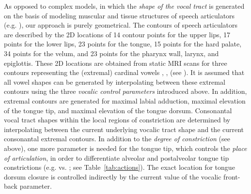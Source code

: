 \documentclass[conference]{IEEEtran}
\let\ipa\textipa
\begin{document}
As opposed to complex models,
in which the \textit{shape of the vocal tract} is
generated on the basis of modeling muscular and tissue structures of
speech articulators (e.g. \cite{dang2004}), our approach is purely
geometrical. The contours of speech articulators are described by the
2D locations of 14 contour points for the upper lips, 17 points for
the lower lips, 23 points for the tongue,
15 points for the hard palate, 34 points for the velum,
and 23 points for the pharynx wall, larynx, and epiglottis.
These 2D locations are obtained from static MRI scans
for three contours representing the (extremal) cardinal vowels \ipa{[i]}, \ipa{[A]},
\ipa{[u]} (see \cite{kroger2005,kroger2004}). It is assumed that all vowel
shapes can be generated by interpolating between these extremal contours
using the three \textit{vocalic control parameters} introduced above.
In addition, extremal contours are generated for maximal labial
adduction, maximal elevation of the tongue tip, and
maximal elevation of the tongue dorsum.
Consonantal vocal tract shapes
within the local regions of constriction are
determined by interpolating between the current underlying vocalic
tract shape and the current consonantal extremal contours.
In addition to the \textit{degree of constriction} (see above),
one more parameter is needed for the
tongue tip, which controls the \textit{place of articulation},
in order to differentiate alveolar and postalveolar tongue tip
constrictions (e.g. \ipa{[s]} vs. \ipa{[S]}; see Table~\ref{tab:actions}). The
exact location for tongue dorsum closure is controlled indirectly by
the current value of the vocalic front-back parameter.
\end{document}
